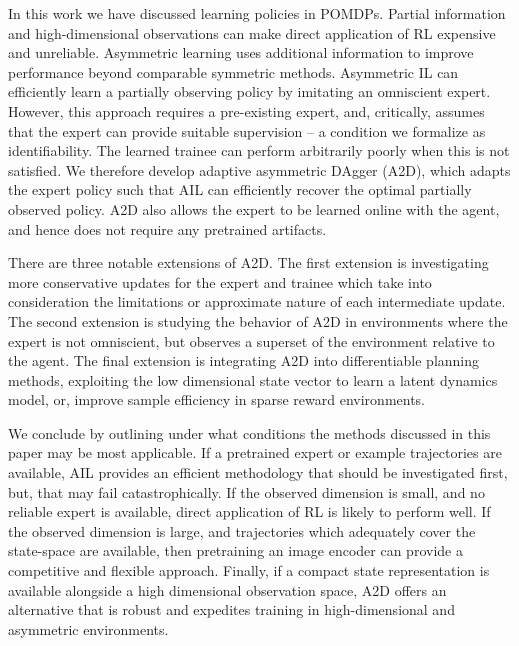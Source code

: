 \label{sec:discussion}

In this work we have discussed learning policies in POMDPs.  Partial information and high-dimensional observations can make direct application of RL expensive and unreliable.  Asymmetric learning uses additional information to improve performance beyond comparable symmetric methods.  Asymmetric IL can efficiently learn a partially observing policy by imitating an omniscient expert.  However, this approach requires a pre-existing expert, and, critically, assumes that the expert can provide suitable supervision -- a condition we formalize as identifiability.  The learned trainee can perform arbitrarily poorly when this is not satisfied.  We therefore develop adaptive asymmetric DAgger (A2D), which adapts the expert policy such that AIL can efficiently recover the optimal partially observed policy.  A2D also allows the expert to be learned online with the agent, and hence does not require any pretrained artifacts.  

There are three notable extensions of A2D.  The first extension is investigating more conservative updates for the expert and trainee which take into consideration the limitations or approximate nature of each intermediate update.  The second extension is studying the behavior of A2D in environments where the expert is not omniscient, but observes a superset of the environment relative to the agent. The final extension is integrating A2D into differentiable planning methods, exploiting the low dimensional state vector to learn a latent dynamics model, or, improve sample efficiency in sparse reward environments.

We conclude by outlining under what conditions the methods discussed in this paper may be most applicable.  If a pretrained expert or example trajectories are available, AIL provides an efficient methodology that should be investigated first, but, that may fail catastrophically.  If the observed dimension is small, and no reliable expert is available, direct application of RL is likely to perform well.  If the observed dimension is large, and trajectories which adequately cover the state-space are available, then pretraining an image encoder can provide a competitive and flexible approach.  Finally, if a compact state representation is available alongside a high dimensional observation space, A2D offers an alternative that is robust and expedites training in high-dimensional and asymmetric environments.  
